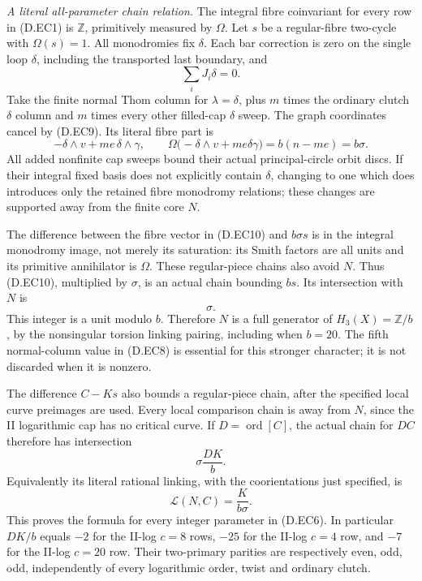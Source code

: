 \emph{A literal all-parameter chain relation.}
The integral fibre coinvariant for every row in (D.EC1)
is $\mathbb Z$, primitively measured by $\Omega$.
Let $s$ be a regular-fibre two-cycle with $\Omega(s)=1$.
All monodromies fix $\delta$. Each bar correction is
zero on the single loop $\delta$, including the
transported last boundary, and
\[
                         \sum_iJ_i\delta=0.               \tag{D.EC9}
\]
Take the finite normal Thom column for $\lambda=\delta$,
plus $m$ times the ordinary clutch $\delta$ column and
$m$ times every other filled-cap $\delta$ sweep.
The graph coordinates cancel by (D.EC9). Its literal
fibre part is
\[
                  -\delta\wedge v+me\,\delta\wedge\gamma,
 \qquad\Omega\bigl(-\delta\wedge v+me\delta\gamma\bigr)
                                      =b(n-me)=b\sigma .
                                                               \tag{D.EC10}
\]
All added nonfinite cap sweeps bound their actual
principal-circle orbit discs. If their integral fixed
basis does not explicitly contain $\delta$, changing
to one which does introduces only the retained fibre
monodromy relations; these changes are supported away
from the finite core $N$.

The difference between the fibre vector in (D.EC10)
and $b\sigma s$ is in the integral monodromy image,
not merely its saturation: its Smith factors are all
units and its primitive annihilator is $\Omega$.
These regular-piece chains also avoid $N$.
Thus (D.EC10), multiplied by $\sigma$, is an actual
chain bounding $bs$. Its intersection with $N$ is
\[
                              \sigma .                    \tag{D.EC11}
\]
This integer is a unit modulo $b$. Therefore $N$
is a full generator of $H_3(X)=\mathbb Z/b$, by
the nonsingular torsion linking pairing, including
when $b=20$. The fifth normal-column value in
(D.EC8) is essential for this stronger character;
it is not discarded when it is nonzero.

The difference $C-Ks$ also bounds a regular-piece
chain, after the specified local curve preimages
are used. Every local comparison chain is away
from $N$, since the II logarithmic cap has no
critical curve. If $D=\operatorname{ord}[C]$, the
actual chain for $DC$ therefore has intersection
\[
                       \sigma\frac{DK}{b}.
                                                               \tag{D.EC12}
\]
Equivalently its literal rational linking, with the
coorientations just specified, is
\[
                       \mathcal L(N,C)
                           =\frac{K}{b\sigma}.            \tag{D.EC13}
\]
This proves the formula for every integer parameter
in (D.EC6). In particular $DK/b$ equals $-2$ for
the II-log $c=8$ rows, $-25$ for the II-log $c=4$
row, and $-7$ for the II-log $c=20$ row. Their
two-primary parities are respectively even, odd,
odd, independently of every logarithmic order,
twist and ordinary clutch.

